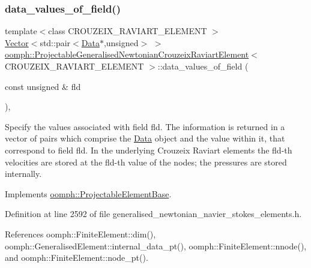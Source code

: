 \subsubsection{\texorpdfstring{data\+\_\+values\+\_\+of\+\_\+field()}{data\_values\_of\_field()}}
{\footnotesize\ttfamily template$<$class C\+R\+O\+U\+Z\+E\+I\+X\+\_\+\+R\+A\+V\+I\+A\+R\+T\+\_\+\+E\+L\+E\+M\+E\+NT $>$ \\
\hyperlink{classoomph_1_1Vector}{Vector}$<$std\+::pair$<$\hyperlink{classoomph_1_1Data}{Data}$\ast$,unsigned$>$ $>$ \hyperlink{classoomph_1_1ProjectableGeneralisedNewtonianCrouzeixRaviartElement}{oomph\+::\+Projectable\+Generalised\+Newtonian\+Crouzeix\+Raviart\+Element}$<$ C\+R\+O\+U\+Z\+E\+I\+X\+\_\+\+R\+A\+V\+I\+A\+R\+T\+\_\+\+E\+L\+E\+M\+E\+NT $>$\+::data\+\_\+values\+\_\+of\+\_\+field (\begin{DoxyParamCaption}\item[{const unsigned \&}]{fld }\end{DoxyParamCaption})\hspace{0.3cm}{\ttfamily [inline]}, {\ttfamily [virtual]}}



Specify the values associated with field fld. The information is returned in a vector of pairs which comprise the \hyperlink{classoomph_1_1Data}{Data} object and the value within it, that correspond to field fld. In the underlying Crouzeix Raviart elements the fld-\/th velocities are stored at the fld-\/th value of the nodes; the pressures are stored internally. 



Implements \hyperlink{classoomph_1_1ProjectableElementBase_a644306ebdf16f334344c2d27d72f18b7}{oomph\+::\+Projectable\+Element\+Base}.



Definition at line 2592 of file generalised\+\_\+newtonian\+\_\+navier\+\_\+stokes\+\_\+elements.\+h.



References oomph\+::\+Finite\+Element\+::dim(), oomph\+::\+Generalised\+Element\+::internal\+\_\+data\+\_\+pt(), oomph\+::\+Finite\+Element\+::nnode(), and oomph\+::\+Finite\+Element\+::node\+\_\+pt().

\mbox{\label{classoomph_1_1ProjectableGeneralisedNewtonianCrouzeixRaviartElement_a28e2853c747d88204673b6aa93f2bf62}} 
